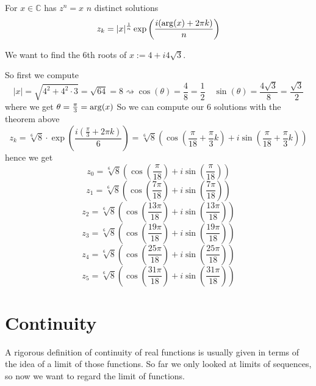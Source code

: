 \begin{theorem}
   For \(x \in \mathbb{C}\) has \(z^n = x\) \(n\) distinct solutions
   \[z_k = \lvert x\rvert^\frac{1}{n} \exp\left(\frac{i(\operatorname{arg}(x) + 2\pi k)}{n}\right)\]
\end{theorem}
\begin{example}
   We want to find the 6th roots of \(x := 4 + i4\sqrt{3}\).

   So first we compute
   \[\lvert x\rvert = \sqrt{4^2 +4^2\cdot 3} = \sqrt{64} = 8 \rightsquigarrow \cos(\theta)=\frac{4}{8} = \frac{1}{2} \quad \sin(\theta) = \frac{4\sqrt{3}}{8} = \frac{\sqrt{3}}{2}\]
   where we get \(\theta = \frac{\pi}{3} = \operatorname{arg}(x)\)
   So we can compute our 6 solutions with the theorem above
   \[z_k = \sqrt[6]{8} \cdot \exp\left(\frac{i(\frac{\pi}{3} + 2\pi k)}{6}\right) = \sqrt[6]{8} \left(\cos\left(\frac{\pi}{18} + \frac{\pi}{3} k\right) + i \sin\left(\frac{\pi}{18} + \frac{\pi}{3}k\right)\right)\]
   hence we get
   \[z_0 = \sqrt[6]{8}\left(\cos\left(\frac{\pi}{18}\right) + i\sin\left(\frac{\pi}{18}\right)\right)\]
   \[z_1 = \sqrt[6]{8}\left(\cos\left(\frac{7\pi}{18}\right) + i\sin\left(\frac{7\pi}{18}\right)\right)\]
   \[z_2 = \sqrt[6]{8}\left(\cos\left(\frac{13\pi}{18}\right) + i\sin\left(\frac{13\pi}{18}\right)\right)\]
   \[z_3 = \sqrt[6]{8}\left(\cos\left(\frac{19\pi}{18}\right) + i\sin\left(\frac{19\pi}{18}\right)\right)\]
   \[z_4 = \sqrt[6]{8}\left(\cos\left(\frac{25\pi}{18}\right) + i\sin\left(\frac{25\pi}{18}\right)\right)\]
   \[z_5 = \sqrt[6]{8}\left(\cos\left(\frac{31\pi}{18}\right) + i\sin\left(\frac{31\pi}{18}\right)\right)\]
\end{example}

\newpage

\section{Continuity}
A rigorous definition of continuity of real functions is usually given in terms of the idea of a limit of those functions.
So far we only looked at limits of sequences, so now we want to regard the limit of functions.

